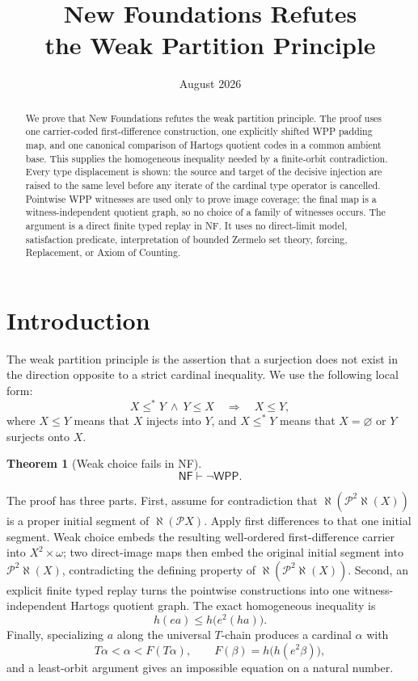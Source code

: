 \documentclass[11pt]{article}
\title{New Foundations Refutes\\the Weak Partition Principle}
\author{}
\date{August 2026}
\newtheorem{theorem}{Theorem}[section]
\numberwithin{equation}{section}
\theoremstyle{definition}
\theoremstyle{remark}
\newcommand{\NF}{\mathsf{NF}}
\newcommand{\WPP}{\mathsf{WPP}}
\newcommand{\Pow}{\mathcal P}
\begin{document}
\maketitle

\begin{abstract}
We prove that New Foundations refutes the weak partition principle.  The
proof uses one carrier-coded first-difference construction, one explicitly
shifted WPP padding map, and one canonical comparison of Hartogs quotient
codes in a common ambient base.  This supplies the homogeneous inequality
needed by a finite-orbit contradiction.  Every type displacement is shown:
the source and target of the decisive injection are raised to the same
level before any iterate of the cardinal type operator is cancelled.
Pointwise WPP witnesses are used only to prove image coverage; the final
map is a witness-independent quotient graph, so no choice of a family of
witnesses occurs.  The argument is a direct finite typed replay in NF.  It
uses no direct-limit model, satisfaction predicate, interpretation of
bounded Zermelo set theory, forcing, Replacement, or Axiom of Counting.
\end{abstract}

\section{Introduction}

The weak partition principle is the assertion that a surjection does not
exist in the direction opposite to a strict cardinal inequality.  We use
the following local form:
\begin{equation}
 X\leq^*Y\ \wedge\ Y\leq X
 \quad\Longrightarrow\quad X\leq Y,
 \label{eq:wpp-local}
\end{equation}
where $X\leq Y$ means that $X$ injects into $Y$, and $X\leq^*Y$
means that $X=\varnothing$ or $Y$ surjects onto $X$.

\begin{theorem}[Weak choice fails in NF]\label{thm:main}
\[
 \NF\vdash\neg\WPP.
\]
\end{theorem}

The proof has three parts.  First, assume for contradiction that
$\aleph(\Pow^2\aleph(X))$ is a proper initial segment of
$\aleph(\Pow X)$.  Apply first differences to that one initial segment.
Weak choice embeds the resulting well-ordered first-difference carrier
into $X^2\times\omega$; two direct-image maps then embed the original
initial segment into $\Pow^2\aleph(X)$, contradicting the defining
property of $\aleph(\Pow^2\aleph(X))$.  Second, an explicit finite typed replay turns
the pointwise constructions into one witness-independent Hartogs quotient
graph.  The exact homogeneous inequality is
\begin{equation}
 h(ea)\leq h\bigl(e^2(ha)\bigr).
 \label{eq:intro-homogeneous}
\end{equation}
Finally, specializing $a$ along the universal $T$-chain produces a
cardinal $\alpha$ with
\[
 T\alpha<\alpha<F(T\alpha),
 \qquad F(\beta)=h\bigl(h(e^2\beta)\bigr),
\]
and a least-orbit argument gives an impossible equation on a natural
number.
\end{document}
